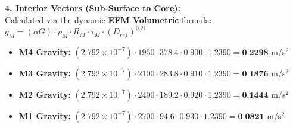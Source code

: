 \documentclass[11pt, a4paper]{article}
\begin{document}
  \vspace{0.5em}
  \noindent \textbf{4. Interior Vectors (Sub-Surface to Core):} \\[0.5em]
  \hspace*{1em} Calculated via the dynamic \textbf{EFM Volumetric} formula: $g_M = (\alpha G) \cdot \rho_{M} \cdot R_M \cdot \tau_M \cdot (D_{ref})^{0.21}$
  \begin{itemize}
    \item \textbf{M4 Gravity:} $(2.792 \times 10^{-7}) \cdot 1950 \cdot 378.4 \cdot 0.900 \cdot 1.2390 = \textbf{0.2298}$ m/s$^2$
    \item \textbf{M3 Gravity:} $(2.792 \times 10^{-7}) \cdot 2100 \cdot 283.8 \cdot 0.910 \cdot 1.2390 = \textbf{0.1876}$ m/s$^2$
    \item \textbf{M2 Gravity:} $(2.792 \times 10^{-7}) \cdot 2400 \cdot 189.2 \cdot 0.920 \cdot 1.2390 = \textbf{0.1444}$ m/s$^2$
    \item \textbf{M1 Gravity:} $(2.792 \times 10^{-7}) \cdot 2700 \cdot 94.6 \cdot 0.930 \cdot 1.2390 = \textbf{0.0821}$ m/s$^2$
  \end{itemize}
\end{document}
